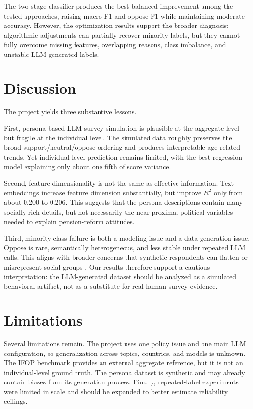 ﻿\documentclass[10pt,twocolumn]{article}
\begin{document}
The two-stage classifier produces the best balanced improvement among the tested approaches, raising macro F1 and oppose F1 while maintaining moderate accuracy. However, the optimization results support the broader diagnosis: algorithmic adjustments can partially recover minority labels, but they cannot fully overcome missing features, overlapping reasons, class imbalance, and unstable LLM-generated labels.

\section{Discussion}
The project yields three substantive lessons.

First, persona-based LLM survey simulation is plausible at the aggregate level but fragile at the individual level. The simulated data roughly preserves the broad support/neutral/oppose ordering and produces interpretable age-related trends. Yet individual-level prediction remains limited, with the best regression model explaining only about one fifth of score variance.

Second, feature dimensionality is not the same as effective information. Text embeddings increase feature dimension substantially, but improve $R^2$ only from about 0.200 to 0.206. This suggests that the persona descriptions contain many socially rich details, but not necessarily the near-proximal political variables needed to explain pension-reform attitudes.

Third, minority-class failure is both a modeling issue and a data-generation issue. Oppose is rare, semantically heterogeneous, and less stable under repeated LLM calls. This aligns with broader concerns that synthetic respondents can flatten or misrepresent social groups \cite{wang2024replace,cheng2023marked}. Our results therefore support a cautious interpretation: the LLM-generated dataset should be analyzed as a simulated behavioral artifact, not as a substitute for real human survey evidence.

\section{Limitations}
Several limitations remain. The project uses one policy issue and one main LLM configuration, so generalization across topics, countries, and models is unknown. The IFOP benchmark provides an external aggregate reference, but it is not an individual-level ground truth. The persona dataset is synthetic and may already contain biases from its generation process. Finally, repeated-label experiments were limited in scale and should be expanded to better estimate reliability ceilings.
\end{document}
